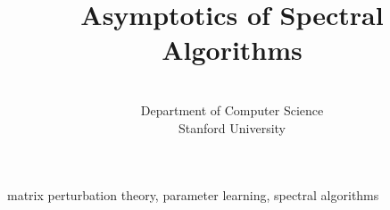 \documentclass[tablecaption=bottom]{jmlr} %
\title[Asymptotics of Spectral Algorithms]{Asymptotics of Spectral Algorithms}
\author{\Name{Arun Tejasvi {Chaganty}} \Email{chaganty@stanford.edu}\AND
  \Name{Percy {Liang}} \Email{pliang@stanford.edu}\\
  \addr Department of Computer Science\\Stanford University}
\begin{document}


\maketitle

\begin{keywords}
matrix perturbation theory, parameter learning, spectral algorithms
\end{keywords}







\appendix


\end{document}
